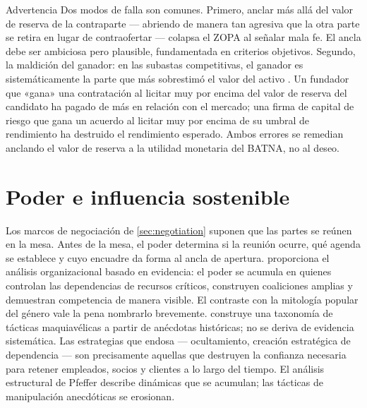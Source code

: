 \begin{admonition}{Advertencia}
Dos modos de falla son comunes. Primero, anclar más allá del valor de reserva de la contraparte
--- abriendo de manera tan agresiva que la otra parte se retira en lugar de contraofertar ---
colapsa el ZOPA al señalar mala fe. El ancla debe ser ambiciosa pero plausible, fundamentada en
criterios objetivos. Segundo, la maldición del ganador: en las subastas competitivas, el ganador
es sistemáticamente la parte que más sobrestimó el valor del activo
\parencite{thaler1988winnerscurse}. Un fundador que «gana» una contratación al licitar muy por
encima del valor de reserva del candidato ha pagado de más en relación con el mercado; una firma
de capital de riesgo que gana un acuerdo al licitar muy por encima de su umbral de rendimiento
ha destruido el rendimiento esperado.
Ambos errores se remedian anclando el valor de reserva a la utilidad monetaria del BATNA, no
al deseo.
\end{admonition}


\section{Poder e influencia sostenible}\label{sec:power-trust}

Los marcos de negociación de \cref{sec:negotiation} suponen que las partes se reúnen en la
mesa. Antes de la mesa, el poder determina si la reunión ocurre, qué agenda se establece y
cuyo encuadre da forma al ancla de apertura. \textcite{pfeffer2010power} proporciona el análisis
organizacional basado en evidencia: el poder se acumula en quienes controlan las dependencias
de recursos críticos, construyen coaliciones amplias y demuestran competencia de manera visible.
El contraste con la mitología popular del género vale la pena nombrarlo brevemente.
\textcite{greene1998laws} construye una taxonomía de tácticas maquiavélicas a partir de anécdotas
históricas; no se deriva de evidencia sistemática. Las estrategias que endosa --- ocultamiento,
creación estratégica de dependencia --- son precisamente aquellas que destruyen la confianza
necesaria para retener empleados, socios y clientes a lo largo del tiempo. El análisis
estructural de Pfeffer describe dinámicas que se acumulan; las tácticas de manipulación
anecdóticas se erosionan.

